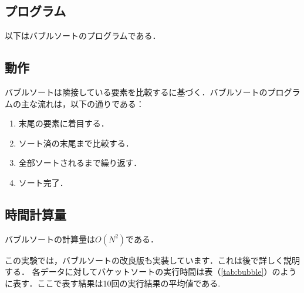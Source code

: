 \documentclass[a4j, titlepage]{jarticle}
\begin{document}
        \subsection{プログラム}
            以下はバブルソートのプログラムである．
            

        \subsection{動作}
            バブルソートは隣接している要素を比較するに基づく．バブルソートのプログラムの主な流れは，以下の通りである：
            \begin{screen}
                    \begin{enumerate}
                        \item 末尾の要素に着目する．
                        \item ソート済の末尾まで比較する．
                        \item 全部ソートされるまで繰り返す．
                        \item ソート完了．
                    \end{enumerate}    
            \end{screen}

        \subsection{時間計算量}
            バブルソートの計算量は$ O(N^2) $である．

            この実験では，バブルソートの改良版も実装しています．これは後で詳しく説明する．
            各データに対してバケットソートの実行時間は表（\ref{tab:bubble}）のように表す．ここで表す結果は10回の実行結果の平均値である.
\end{document}
